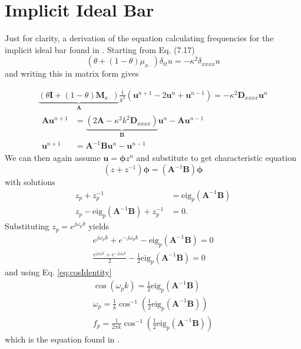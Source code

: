 \documentclass{article}
\def\u{\mathbf{u}}
\def\I{\mathbf{I}}
\def\A{\mathbf{A}}
\def\B{\mathbf{B}}
\begin{document}
\section{Implicit Ideal Bar}
Just for clarity, a derivation of the equation calculating frequencies for the implicit ideal bar found in \cite[Section 7.1.5, p. 174]{Bilbao2009}. Starting from Eq. (7.17)
\begin{equation}
    (\theta + (1-\theta)\mu_{x\cdot})\delta_{tt}u = -\kappa^2\delta_{xxxx}u
\end{equation}
and writing this in matrix form gives

\begin{gather*}
    \underbrace{(\theta \I + (1-\theta)\mathbf{M}_{x\cdot})}_{\A}\frac{1}{k^2}(\u^{n+1} - 2\u^n + \u^{n-1}) = -\kappa^2\mathbf{D}_{xxxx}\u^n\\
    \begin{aligned}
    \A\u^{n+1} &= \underbrace{(2\A-\kappa^2k^2\mathbf{D}_{xxxx})}_{\B}\u^n - \A\u^{n-1}\\
    \u^{n+1} &= \A^{-1}\B\u^n - \u^{n-1}
    \end{aligned}
\end{gather*}
We can then again assume $\u = \boldsymbol{\phi}z^n$ and substitute to get characteristic equation
\begin{equation}
    (z + z^{-1})\boldsymbol{\phi} = (\A^{-1}\B)\boldsymbol{\phi}
\end{equation}
with solutions
\begin{align*}
    z_p + z_p^{-1} &= \text{eig}_p(\A^{-1}\B)\\
 z_p -\text{eig}_p(\A^{-1}\B) + z_p^{-1} &= 0.
\end{align*}
Substituting $z_p = e^{j\omega_pk}$ yields
\begin{align*}
    e^{j\omega_pk}+e^{-j\omega_pk} - \text{eig}_p(\A^{-1}\B) = 0\\
    \frac{e^{j\omega_pk}+e^{-j\omega_pk}}{2} - \frac{1}{2}\text{eig}_p(\A^{-1}\B) = 0
\end{align*}
and using Eq. \eqref{eq:cosIdentity}
\begin{align}
    \cos(\omega_pk) = \frac{1}{2}\text{eig}_p(\A^{-1}\B)\nonumber\\
    \omega_p =\frac{1}{k}\cos^{-1}\left(\frac{1}{2}\text{eig}_p(\A^{-1}\B)\right)\nonumber\\
    f_p =\frac{1}{2\pi k}\cos^{-1}\left(\frac{1}{2}\text{eig}_p(\A^{-1}\B)\right)
\end{align}
which is the equation found in \cite[p. 174]{Bilbao2009}.
\end{document}
